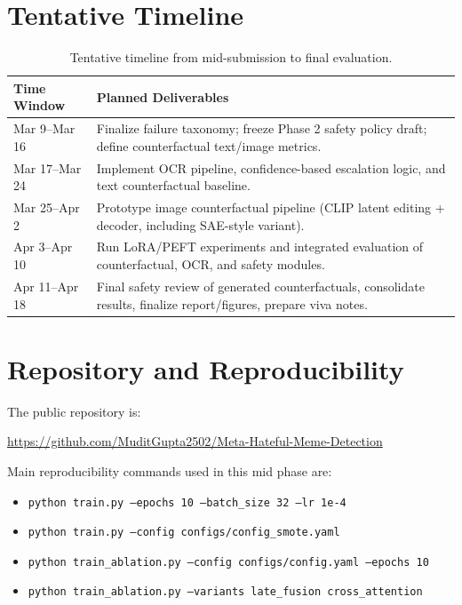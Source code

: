 \documentclass[11pt]{article}
\begin{document}
\section{Tentative Timeline}
\begin{table}[h]
\centering
\small
\caption{Tentative timeline from mid-submission to final evaluation.}
\begin{tabularx}{\columnwidth}{lX}
\toprule
Time Window & Planned Deliverables \\
\midrule
Mar 9--Mar 16 & Finalize failure taxonomy; freeze Phase 2 safety policy draft; define counterfactual text/image metrics. \\
Mar 17--Mar 24 & Implement OCR pipeline, confidence-based escalation logic, and text counterfactual baseline. \\
Mar 25--Apr 2 & Prototype image counterfactual pipeline (CLIP latent editing + decoder, including SAE-style variant). \\
Apr 3--Apr 10 & Run LoRA/PEFT experiments and integrated evaluation of counterfactual, OCR, and safety modules. \\
Apr 11--Apr 18 & Final safety review of generated counterfactuals, consolidate results, finalize report/figures, prepare viva notes. \\
\bottomrule
\end{tabularx}
\label{tab:timeline}
\end{table}

\section{Repository and Reproducibility}
The public repository is:
\begin{center}
\url{https://github.com/MuditGupta2502/Meta-Hateful-Meme-Detection}
\end{center}

Main reproducibility commands used in this mid phase are:
\begin{itemize}[leftmargin=*]
  \item \texttt{python train.py --epochs 10 --batch\_size 32 --lr 1e-4}
  \item \texttt{python train.py --config configs/config\_smote.yaml}
  \item \texttt{python train\_ablation.py --config configs/config.yaml --epochs 10}
  \item \texttt{python train\_ablation.py --variants late\_fusion cross\_attention}
\end{itemize}
\end{document}
